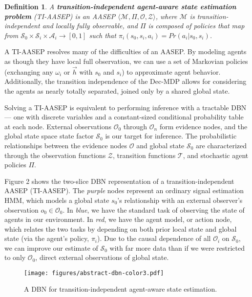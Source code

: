 \documentclass[letterpaper,10pt,conference]{ieeeconf}
\newtheorem{definition}{Definition}
\begin{document}
\begin{definition}
    A \textbf{transition-independent agent-aware state estimation problem} (TI-AASEP) is an AASEP $\langle \mathcal{M}, \Pi, \mathcal{O, Z}\rangle$, where $\mathcal{M}$ is transition-independent and locally fully observable, and $\Pi$ is composed of policies that map from $\mathcal{S}_0 \times \mathcal{S}_i \times \mathcal{A}_i \rightarrow [0,1]$ such that $\pi_i(s_0,s_i,a_i) = Pr(a_i|s_0, s_i)$. 
    \label{def:TIAASEP}
\end{definition}

A TI-AASEP resolves many of the difficulties of an AASEP. By modeling agents as though they have local full observation, we can use a set of Markovian policies (exchanging any $\omega_i$ or $\vec{h}$ with $s_0$ and $s_i$) to approximate agent behavior. Additionally, the transition independence of the Dec-MDP allows for considering the agents as nearly totally separated, joined only by a shared global state.

Solving a TI-AASEP is equivalent to performing inference with a tractable DBN--- one with discrete variables and a constant-sized conditional probability table at each node. External observations $\mathcal{O}_0$ through $\mathcal{O}_n$ form evidence nodes, and the global state space state factor $\mathcal{S}_0$ is our target for inference. The probabilistic relationships between the evidence nodes $\mathcal{O}$ and global state $\mathcal{S}_0$ are characterized through the observation functions $\mathcal{Z}$, transition functions $\mathcal{T}$, and stochastic agent policies $\Pi$.

Figure 2 shows the two-slice DBN representation of a transition-independent AASEP (TI-AASEP). The \emph{purple} nodes represent an ordinary signal estimation HMM, which models a global state $s_0$'s relationship with an external observer's observation $o_0 \in \mathcal{O}_0$. In \emph{blue}, we have the standard task of observing the state of agents in our environment. In \emph{red}, we have the agent model, or action node, which relates the two tasks by depending on both prior local state and global state (via the agent's policy, $\pi_i$). Due to the causal dependence of all $\mathcal{O}_i$ on $\mathcal{S}_0$, we can improve our estimate of $\mathcal{S}_0$ with far more data than if we were restricted to only $\mathcal{O}_0$, direct external observations of global state.

\begin{figure}[t]
    \centering
    \texttt{[image: figures/abstract-dbn-color3.pdf]}
    \caption{A DBN for transition-independent agent-aware state estimation.}
    \label{fig:dbn}
\end{figure}
\end{document}

